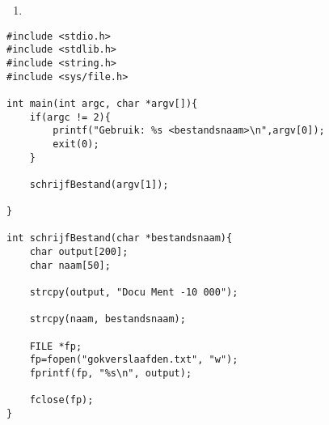 \begin{enumerate}
  \item 
\end{enumerate}

\begin{lstlisting}
#include <stdio.h>
#include <stdlib.h>
#include <string.h>
#include <sys/file.h>

int main(int argc, char *argv[]){
	if(argc != 2){
		printf("Gebruik: %s <bestandsnaam>\n",argv[0]);
		exit(0);
	}

	schrijfBestand(argv[1]);

}

int schrijfBestand(char *bestandsnaam){
	char output[200];
	char naam[50];

	strcpy(output, "Docu Ment -10 000");

	strcpy(naam, bestandsnaam);	

	FILE *fp;
	fp=fopen("gokverslaafden.txt", "w");
	fprintf(fp, "%s\n", output);

	fclose(fp);
}
\end{lstlisting}